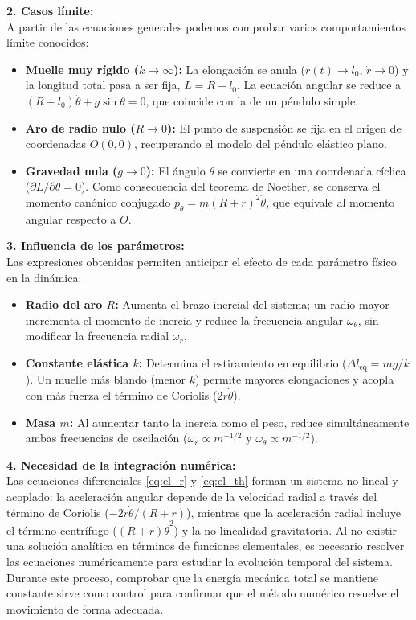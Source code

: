 \documentclass[11pt,a4paper]{article}
\begin{document}
\textbf{2. Casos límite:}\\
A partir de las ecuaciones generales podemos comprobar varios comportamientos límite conocidos:
\begin{itemize}\setlength{\itemsep}{1pt}\setlength{\parskip}{0pt}
    \item \textbf{Muelle muy rígido ($k \to \infty$):} La elongación se anula ($r(t) \to l_0$, $\dot{r} \to 0$) y la longitud total pasa a ser fija, $L = R + l_0$. La ecuación angular se reduce a $(R + l_0)\ddot{\theta} + g\sin\theta = 0$, que coincide con la de un péndulo simple.
    \item \textbf{Aro de radio nulo ($R \to 0$):} El punto de suspensión se fija en el origen de coordenadas $O(0,0)$, recuperando el modelo del péndulo elástico plano.
    \item \textbf{Gravedad nula ($g \to 0$):} El ángulo $\theta$ se convierte en una coordenada cíclica ($\partial L/\partial \theta = 0$). Como consecuencia del teorema de Noether, se conserva el momento canónico conjugado $p_\theta = m(R+r)^2\dot{\theta}$, que equivale al momento angular respecto a $O$.
\end{itemize}

\textbf{3. Influencia de los parámetros:}\\
Las expresiones obtenidas permiten anticipar el efecto de cada parámetro físico en la dinámica:
\begin{itemize}\setlength{\itemsep}{1pt}\setlength{\parskip}{0pt}
    \item \textbf{Radio del aro $R$:} Aumenta el brazo inercial del sistema; un radio mayor incrementa el momento de inercia y reduce la frecuencia angular $\omega_\theta$, sin modificar la frecuencia radial $\omega_r$.
    \item \textbf{Constante elástica $k$:} Determina el estiramiento en equilibrio ($\Delta l_{\text{eq}} = mg/k$). Un muelle más blando (menor $k$) permite mayores elongaciones y acopla con más fuerza el término de Coriolis ($2\dot{r}\dot{\theta}$).
    \item \textbf{Masa $m$:} Al aumentar tanto la inercia como el peso, reduce simultáneamente ambas frecuencias de oscilación ($\omega_r \propto m^{-1/2}$ y $\omega_\theta \propto m^{-1/2}$).
\end{itemize}

\textbf{4. Necesidad de la integración numérica:}\\
Las ecuaciones diferenciales \eqref{eq:el_r} y \eqref{eq:el_th} forman un sistema no lineal y acoplado: la aceleración angular depende de la velocidad radial a través del término de Coriolis ($-2\dot{r}\dot{\theta}/(R+r)$), mientras que la aceleración radial incluye el término centrífugo ($(R+r)\dot{\theta}^2$) y la no linealidad gravitatoria. Al no existir una solución analítica en términos de funciones elementales, es necesario resolver las ecuaciones numéricamente para estudiar la evolución temporal del sistema. Durante este proceso, comprobar que la energía mecánica total se mantiene constante sirve como control para confirmar que el método numérico resuelve el movimiento de forma adecuada.
\end{document}
